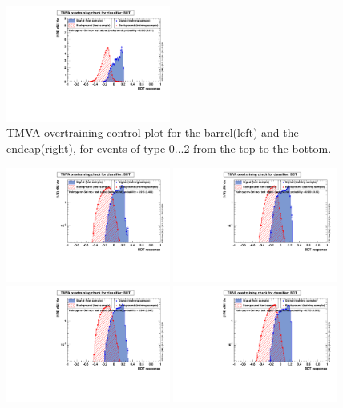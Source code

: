 \begin{figure}
                \includegraphics[width=0.48\textwidth]{Figures/bdt/overtrain_BDT_endcaps_2}
        \caption{TMVA overtraining control plot for the barrel(left) and the endcap(right), for events of type 0...2 from the top to the bottom. }
        \label{fig:overtrain_BDT_controlPlots}
\end{figure}

\begin{figure}
        \centering
                \includegraphics[width=0.48\textwidth]{Figures/bdt/overtrain_BDT_barrel_0_log}
                \includegraphics[width=0.48\textwidth]{Figures/bdt/overtrain_BDT_endcaps_0_log}
                \includegraphics[width=0.48\textwidth]{Figures/bdt/overtrain_BDT_barrel_1_log}
                \includegraphics[width=0.48\textwidth]{Figures/bdt/overtrain_BDT_endcaps_1_log}

\end{figure}
